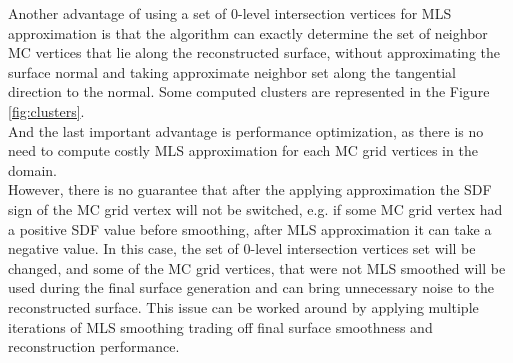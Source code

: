 Another advantage of using a set of 0-level intersection vertices for MLS approximation is that the algorithm can exactly determine the set of neighbor MC vertices that lie along the reconstructed surface, without approximating the surface normal and taking approximate neighbor set along the tangential direction to the normal. Some computed clusters are represented in the Figure \ref{fig:clusters}.\\

And the last important advantage is performance optimization, as there is no need to compute costly MLS approximation for each MC grid vertices in the domain.\\

However, there is no guarantee that after the applying approximation the SDF sign of the MC grid vertex will not be switched, e.g. if some MC grid vertex had a positive SDF value before smoothing, after MLS approximation it can take a negative value. In this case, the set of 0-level intersection vertices set will be changed, and some of the MC grid vertices, that were not MLS smoothed will be used during the final surface generation and can bring unnecessary noise to the reconstructed surface. This issue can be worked around by applying multiple iterations of MLS smoothing trading off final surface smoothness and reconstruction performance.\\
